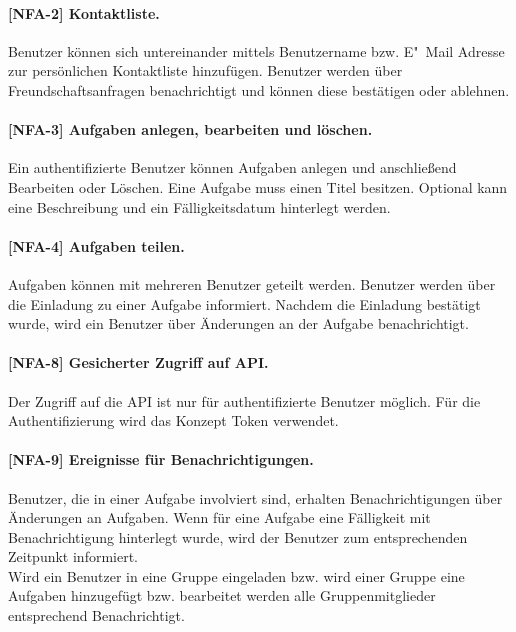 \paragraph{[NFA-2] Kontaktliste.}\label{fa-2} Benutzer können sich untereinander mittels Benutzername bzw. E"~Mail Adresse zur persönlichen Kontaktliste hinzufügen. Benutzer werden über Freundschaftsanfragen benachrichtigt und können diese bestätigen oder ablehnen.

\paragraph{[NFA-3] Aufgaben anlegen, bearbeiten und löschen.}\label{fa-3} Ein authentifizierte Benutzer können Aufgaben anlegen und anschließend Bearbeiten oder Löschen. Eine Aufgabe muss einen Titel besitzen. Optional kann eine Beschreibung und ein Fälligkeitsdatum hinterlegt werden.

\paragraph{[NFA-4] Aufgaben teilen.} \label{fa-4} Aufgaben können mit mehreren Benutzer geteilt werden. Benutzer werden über die Einladung zu einer Aufgabe informiert. Nachdem die Einladung bestätigt wurde, wird ein Benutzer über Änderungen an der Aufgabe benachrichtigt. \\

\paragraph{[NFA-8] Gesicherter Zugriff auf API.} Der Zugriff auf die API ist nur für authentifizierte Benutzer möglich. Für die Authentifizierung wird das Konzept Token verwendet.

\paragraph{[NFA-9] Ereignisse für Benachrichtigungen.}\label{nfa-9} Benutzer, die in einer Aufgabe involviert sind, erhalten Benachrichtigungen über Änderungen an Aufgaben. Wenn für eine Aufgabe eine Fälligkeit mit Benachrichtigung hinterlegt wurde, wird der Benutzer zum entsprechenden Zeitpunkt informiert.\\
Wird ein Benutzer in eine Gruppe eingeladen bzw. wird einer Gruppe eine Aufgaben hinzugefügt bzw. bearbeitet werden alle Gruppenmitglieder entsprechend Benachrichtigt.

